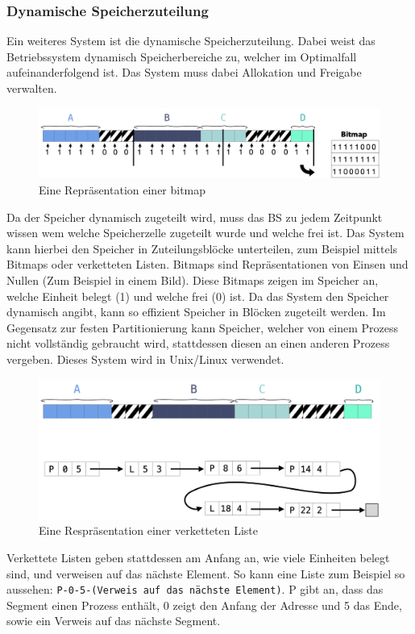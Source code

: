 \documentclass{article}
\begin{document}
	\subsubsection{Dynamische Speicherzuteilung}
	Ein weiteres System ist die dynamische Speicherzuteilung. Dabei weist das Betriebssystem dynamisch Speicherbereiche zu, welcher im Optimalfall aufeinanderfolgend ist. Das System muss dabei Allokation und Freigabe verwalten. \\
	\begin{figure}[H]
	\centering
	\includegraphics[scale=0.38]{Bilder/bitmap.png}
	\caption{Eine Repräsentation einer bitmap}
	\end{figure}
	Da der Speicher dynamisch zugeteilt wird, muss das BS zu jedem Zeitpunkt wissen wem welche Speicherzelle zugeteilt wurde und welche frei ist. Das System kann hierbei den Speicher in Zuteilungsblöcke unterteilen, zum Beispiel mittels Bitmaps oder verketteten Listen. Bitmaps sind Repräsentationen von Einsen und Nullen (Zum Beispiel in einem Bild). Diese Bitmaps zeigen im Speicher an, welche Einheit belegt (1) und welche frei (0) ist. Da das System den Speicher dynamisch angibt, kann so effizient Speicher in Blöcken zugeteilt werden. Im Gegensatz zur festen Partitionierung kann Speicher, welcher von einem Prozess nicht vollständig gebraucht wird, stattdessen diesen an einen anderen Prozess vergeben. Dieses System wird in Unix/Linux verwendet.
	\begin{figure}[H]
	\centering
	\includegraphics[scale=0.4]{Bilder/linkedlist.png}
	\caption{Eine Respräsentation einer verketteten Liste}
	\end{figure}
	Verkettete Listen geben stattdessen am Anfang an, wie viele Einheiten belegt sind, und verweisen auf das nächste Element. So kann eine Liste zum Beispiel so aussehen: \verb|P-0-5-(Verweis auf das nächste Element)|. P gibt an, dass das Segment einen Prozess enthält, 0 zeigt den Anfang der Adresse und 5 das Ende, sowie ein Verweis auf das nächste Segment. \\
\end{document}
